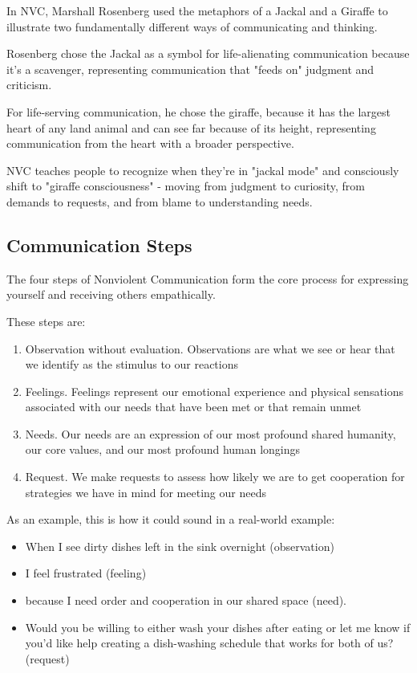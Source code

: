 In NVC, Marshall Rosenberg used the metaphors of a Jackal and a Giraffe to illustrate two fundamentally different ways of communicating and thinking.

Rosenberg chose the Jackal as a symbol for life-alienating communication because it's a scavenger, representing communication that "feeds on" judgment and criticism.

For life-serving communication, he chose the giraffe, because it has the largest heart of any land animal and can see far because of its height, representing communication from the heart with a broader perspective.

NVC teaches people to recognize when they're in "jackal mode" and consciously shift to "giraffe consciousness" - moving from judgment to curiosity, from demands to requests, and from blame to understanding needs.

\subsection{Communication Steps}

The four steps of Nonviolent Communication form the core process for expressing yourself and receiving others empathically. 

These steps are:

\begin{enumerate}
    \item Observation without evaluation. Observations are what we see or hear that we identify as the stimulus to our reactions
    \item Feelings. Feelings represent our emotional experience and physical sensations associated with our needs that have been met or that remain unmet
    \item Needs. Our needs are an expression of our most profound shared humanity, our core values, and our most profound human longings
    \item Request. We make requests to assess how likely we are to get cooperation for strategies we have in mind for meeting our needs
\end{enumerate}

As an example, this is how it could sound in a real-world example:

\begin{itemize}
    \item When I see dirty dishes left in the sink overnight (observation)
    \item I feel frustrated (feeling) 
    \item because I need order and cooperation in our shared space (need). 
    \item Would you be willing to either wash your dishes after eating or let me know if you'd like help creating a dish-washing schedule that works for both of us? (request)
\end{itemize}

